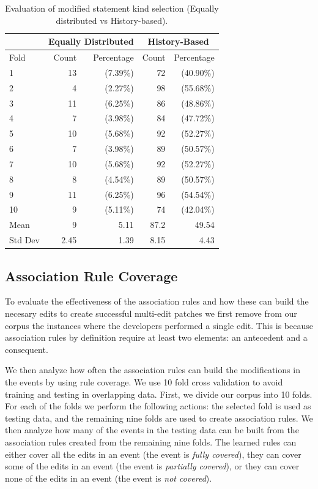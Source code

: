 \documentclass[sigconf]{acmart}
\begin{document}
\begin{table}[]
\centering
\caption{Evaluation of modified statement kind selection (Equally distributed vs History-based).}
\label{10FoldEDvsHB}
\begin{tabular}{l|rr|rr}
\toprule
   &   \multicolumn{2}{c|}{ Equally Distributed}   &   \multicolumn{2}{|c}{ History-Based} \\
\midrule
Fold  &   Count & Percentage  &  Count & Percentage  \\
\midrule
1&13&(7.39\%) & 72&(40.90\%) \\
2&4&(2.27\%) & 98&(55.68\%) \\
3&11&(6.25\%) & 86&(48.86\%) \\
4&7&(3.98\%) & 84&(47.72\%) \\
5&10&(5.68\%) & 92&(52.27\%) \\
6&7&(3.98\%) & 89&(50.57\%) \\
7&10&(5.68\%) & 92&(52.27\%) \\
8&8&(4.54\%) & 89&(50.57\%) \\
9&11&(6.25\%) & 96&(54.54\%) \\
10&9&(5.11\%) & 74&(42.04\%) \\
\bottomrule
Mean &9 & 5.11 & 87.2 & 49.54 \\
\bottomrule
Std Dev & 2.45 & 1.39 & 8.15 & 4.43 \\
\bottomrule

\end{tabular}
\end{table}



\subsection{Association Rule Coverage}
To evaluate the effectiveness
of the association rules and how these can build the
necesary edits to create successful multi-edit patches we first
remove from our corpus the instances where the developers
performed a single edit. This is because association rules
by definition require at least two elements: an antecedent
and a consequent. 

We then analyze how often the association rules can build the 
modifications in the events by using rule coverage. We use 10 fold cross validation to avoid training and testing in overlapping data.
First, we divide our corpus into 10 folds.
For each of the folds we perform the following actions:
the selected fold is used as testing data, and the
remaining nine folds are used to create association rules.
We then analyze how many of the events in the testing data
can be built from the association 
rules created from the remaining nine folds.
The learned rules can either cover all the edits in an event (the 
event is \emph{fully covered}), they can cover some of the edits in an 
event (the event is \emph{partially covered}), or they can cover none of
the edits in an event (the event is \emph{not covered}).
\end{document}
